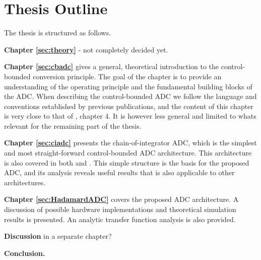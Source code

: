 \section{Thesis Outline}
The thesis is structured as follows.

\textbf{Chapter \ref{sec:theory}} - not completely decided yet.

\textbf{Chapter \ref{sec:cbadc} }gives a general, theoretical introduction to the control-bounded conversion principle. The goal of the chapter is to provide an understanding of the operating principle and the fundamental building blocks of the ADC. When describing the control-bounded ADC we follow the language and conventions established by previous publications, and the content of this chapter is very close to that of \cite{malmberg_thesis}, chapter 4. It is however less general and limited to whats relevant for the remaining part of the thesis.

\textbf{Chapter \ref{sec:ciadc}} presents the chain-of-integrator ADC, which is the simplest and most straight-forward control-bounded ADC architecture. This architecture is also covered in both \cite{cbc_2020_loeliger} and \cite{malmberg_thesis}. This simple structure is the basis for the proposed ADC, and its analysis reveals useful results that is also applicable to other architectures.

\textbf{Chapter \ref{sec:HadamardADC}} covers the proposed ADC architecture. A discussion of possible hardware implementations and theoretical simulation results is presented. An analytic transfer function analysis is also provided.

\textbf{Discussion }in a separate chapter?

\textbf{Conclusion.}


